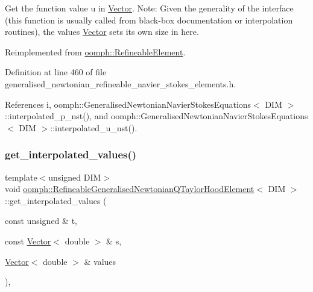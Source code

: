 Get the function value u in \hyperlink{classoomph_1_1Vector}{Vector}. Note\+: Given the generality of the interface (this function is usually called from black-\/box documentation or interpolation routines), the values \hyperlink{classoomph_1_1Vector}{Vector} sets its own size in here. 



Reimplemented from \hyperlink{classoomph_1_1RefineableElement_ad9a4f92880668a2373326d8306365c43}{oomph\+::\+Refineable\+Element}.



Definition at line 460 of file generalised\+\_\+newtonian\+\_\+refineable\+\_\+navier\+\_\+stokes\+\_\+elements.\+h.



References i, oomph\+::\+Generalised\+Newtonian\+Navier\+Stokes\+Equations$<$ D\+I\+M $>$\+::interpolated\+\_\+p\+\_\+nst(), and oomph\+::\+Generalised\+Newtonian\+Navier\+Stokes\+Equations$<$ D\+I\+M $>$\+::interpolated\+\_\+u\+\_\+nst().

\mbox{\label{classoomph_1_1RefineableGeneralisedNewtonianQTaylorHoodElement_a268e35d957a20409a230d53d9d05442d}} 
\subsubsection{\texorpdfstring{get\+\_\+interpolated\+\_\+values()}{get\_interpolated\_values()}\hspace{0.1cm}{\footnotesize\ttfamily [2/2]}}
{\footnotesize\ttfamily template$<$unsigned D\+IM$>$ \\
void \hyperlink{classoomph_1_1RefineableGeneralisedNewtonianQTaylorHoodElement}{oomph\+::\+Refineable\+Generalised\+Newtonian\+Q\+Taylor\+Hood\+Element}$<$ D\+IM $>$\+::get\+\_\+interpolated\+\_\+values (\begin{DoxyParamCaption}\item[{const unsigned \&}]{t,  }\item[{const \hyperlink{classoomph_1_1Vector}{Vector}$<$ double $>$ \&}]{s,  }\item[{\hyperlink{classoomph_1_1Vector}{Vector}$<$ double $>$ \&}]{values }\end{DoxyParamCaption})\hspace{0.3cm}{\ttfamily [inline]}, {\ttfamily [virtual]}}



